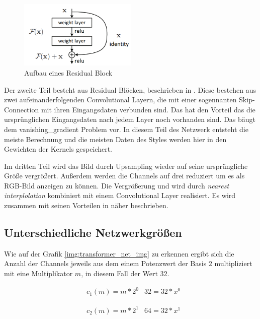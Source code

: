 \begin{figure}[H]
	\centering
	\includegraphics[width=0.50\textwidth]{resources/content/residual_block.png}
	\caption{Aufbau eines Residual Block \cite{residual_block_img}}
	\label{img:residual_block_img}
\end{figure}

Der zweite Teil besteht aus Residual Blöcken, beschrieben in \cite{DBLP:journals/corr/HeZRS15}. Diese bestehen aus zwei aufeinanderfolgenden Convolutional Layern, die mit einer sogennanten Skip-Connection mit ihren Eingangsdaten verbunden sind. Das hat den Vorteil das die ursprünglichen Eingangsdaten nach jedem Layer noch vorhanden sind. Das bäugt dem \gls{vanishing_gradient} Problem vor. In diesem Teil des Netzwerk entsteht die meiste Berechnung und die meisten Daten des Styles werden hier in den Gewichten der Kernels gespeichert.

Im dritten Teil wird das Bild durch Upsampling wieder auf seine ursprüngliche Größe vergrößert. Außerdem werden die Channels auf drei reduziert um es als RGB-Bild anzeigen zu können. Die Vergrößerung und wird durch \textit{nearest interplolation} kombiniert mit einem Convolutional Layer realisiert.
Es wird zusammen mit seinen Vorteilen in \cite{odena2016deconvolution} näher beschrieben.

\subsection{Unterschiedliche Netzwerkgrößen}

Wie auf der Grafik \ref{img:transformer_net_img} zu erkennen ergibt sich die Anzahl der Channels jeweils aus dem einem Potenzwert der Basis $ 2 $ multipliziert mit eine Multiplikator $ m $, in diesem Fall der Wert $ 32 $.

\begin{align}
	& c_{1}(m) = m * 2^{0}
	& 32 = 32 * x^{0}
\end{align}

\begin{align}
	& c_{2}(m) = m * 2^{1}
	& 64 = 32 * x^{1}
\end{align}

